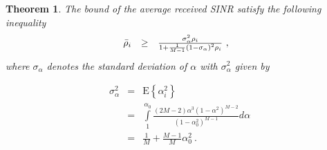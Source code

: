 \documentclass[a4paper,10pt,fleqn, twocolumn]{IEEEtran}
\newtheorem{theorem}{Theorem}
\begin{document}
\begin{theorem} The bound of the average received SINR satisfy the
following inequality
\begin{equation}\hspace{-0.10in}
\begin{array}{rcl}
\bar\rho_{i}&\geq& \frac{\sigma_{\alpha}^{2}\rho_{i}}{1+
\frac{1}{M-1}\left(1-\sigma_{\alpha}\right)^{2}\rho_{i}}\ ,
\end{array}
\end{equation}
\noindent where  $\sigma_{\alpha}$ denotes the standard deviation
of $\alpha$ with $\sigma_{\alpha}^2$ given by

\begin{equation}
\begin{array}{rcl}
\sigma_{\alpha}^2&=&\mbox{E}\left\{\alpha_{i}^2\right\}\\
&=&\int\limits_{1}^{\alpha_{0}}\frac{\left(2M-2\right)\alpha^3\left(1-\alpha^2\right)^{M-2}}{\left(1-\alpha_{0}^{2}\right)^{M-1}}d\alpha\\
&=&\frac{1}{M}+\frac{M-1}{M}\alpha_{0}^2\ .
\end{array}
\end{equation}


\end{theorem}
\begin{figure}
\end{figure}
\end{document}

